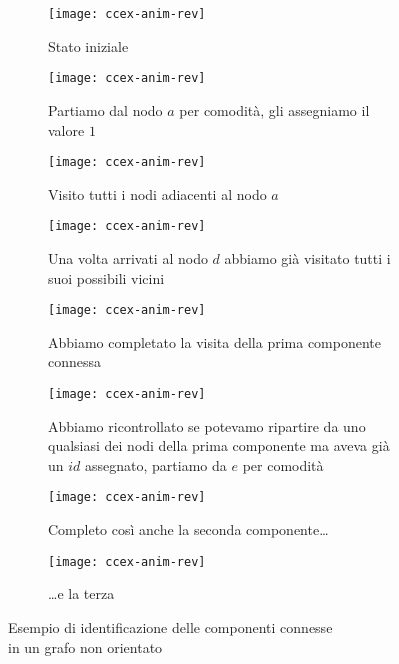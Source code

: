 \clearpage
\begin{figure}[p]

	\begin{subfigure}[t]{.48\textwidth}
		\texttt{[image: ccex-anim-rev]}
		\caption{Stato iniziale}
	\end{subfigure}\hfill
	\begin{subfigure}[t]{.48\textwidth}
		\texttt{[image: ccex-anim-rev]}
		\caption{Partiamo dal nodo \(a\) per comodità,
			gli assegniamo il valore \(1\)}
	\end{subfigure}

	\begin{subfigure}[t]{.48\textwidth}
		\texttt{[image: ccex-anim-rev]}
		\caption{Visito tutti i nodi adiacenti al nodo \(a\)}
	\end{subfigure}\hfill
	\begin{subfigure}[t]{.48\textwidth}
		\texttt{[image: ccex-anim-rev]}
		\caption{Una volta arrivati al nodo \(d\) abbiamo già visitato tutti i suoi possibili vicini}
	\end{subfigure}

	\begin{subfigure}[t]{.48\textwidth}
		\texttt{[image: ccex-anim-rev]}
		\caption{Abbiamo completato la visita della prima componente connessa}
	\end{subfigure}\hfill
	\begin{subfigure}[t]{.48\textwidth}
		\texttt{[image: ccex-anim-rev]}
		\caption{Abbiamo ricontrollato se potevamo ripartire da uno qualsiasi dei nodi della prima componente ma aveva già un \(id\) assegnato, partiamo da \(e\) per comodità}
	\end{subfigure}

	\begin{subfigure}[t]{.48\textwidth}
		\texttt{[image: ccex-anim-rev]}
		\caption{Completo così anche la seconda componente\dots}
	\end{subfigure}\hfill
	\begin{subfigure}[t]{.48\textwidth}
		\texttt{[image: ccex-anim-rev]}
		\caption{\dots e la terza}
	\end{subfigure}

	\caption{Esempio di identificazione delle componenti connesse\\in un grafo non orientato}
\end{figure}
\clearpage

